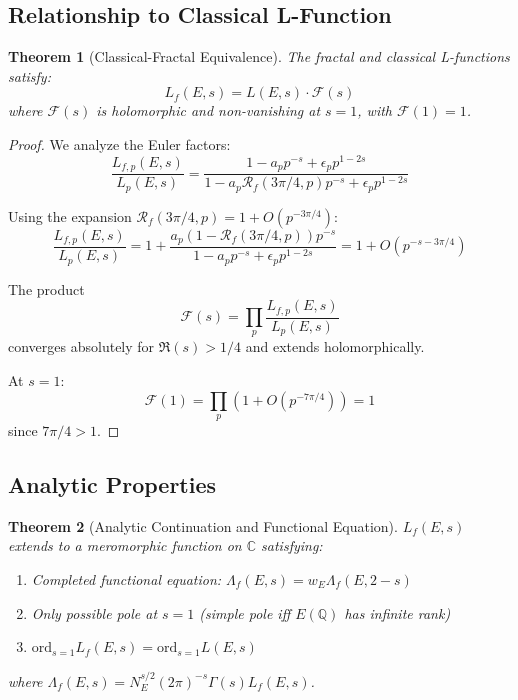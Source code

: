 \documentclass[12pt]{article}
\newcommand{\C}{\mathbb{C}}
\newcommand{\Q}{\mathbb{Q}}
\newcommand{\fractalres}{\mathcal{R}_f}
\newcommand{\ord}{\text{ord}}
\newtheorem{theorem}{Theorem}[section]
\begin{document}
\subsection{Relationship to Classical L-Function}

\begin{theorem}[Classical-Fractal Equivalence]
\label{thm:classical_fractal}
The fractal and classical L-functions satisfy:
\begin{equation}
L_f(E,s) = L(E,s) \cdot \mathcal{F}(s)
\end{equation}
where $\mathcal{F}(s)$ is holomorphic and non-vanishing at $s=1$, with $\mathcal{F}(1) = 1$.
\end{theorem}

\begin{proof}
We analyze the Euler factors:
\begin{equation}
\frac{L_{f,p}(E,s)}{L_p(E,s)} = \frac{1 - a_p p^{-s} + \epsilon_p p^{1-2s}}{1 - a_p \fractalres(3\pi/4,p) p^{-s} + \epsilon_p p^{1-2s}}
\end{equation}

Using the expansion $\fractalres(3\pi/4,p) = 1 + O(p^{-3\pi/4})$:
\begin{equation}
\frac{L_{f,p}(E,s)}{L_p(E,s)} = 1 + \frac{a_p(1-\fractalres(3\pi/4,p))p^{-s}}{1 - a_p p^{-s} + \epsilon_p p^{1-2s}} = 1 + O(p^{-s-3\pi/4})
\end{equation}

The product
\begin{equation}
\mathcal{F}(s) = \prod_p \frac{L_{f,p}(E,s)}{L_p(E,s)}
\end{equation}
converges absolutely for $\Re(s) > 1/4$ and extends holomorphically.

At $s=1$: 
\begin{equation}
\mathcal{F}(1) = \prod_p \left(1 + O(p^{-7\pi/4})\right) = 1
\end{equation}
since $7\pi/4 > 1$.
\end{proof}

\subsection{Analytic Properties}

\begin{theorem}[Analytic Continuation and Functional Equation]
\label{thm:analytic_properties}
$L_f(E,s)$ extends to a meromorphic function on $\C$ satisfying:
\begin{enumerate}
\item Completed functional equation: $\Lambda_f(E,s) = w_E \Lambda_f(E,2-s)$
\item Only possible pole at $s=1$ (simple pole iff $E(\Q)$ has infinite rank)
\item $\ord_{s=1} L_f(E,s) = \ord_{s=1} L(E,s)$
\end{enumerate}
where $\Lambda_f(E,s) = N_E^{s/2}(2\pi)^{-s}\Gamma(s)L_f(E,s)$.
\end{theorem}
\end{document}

